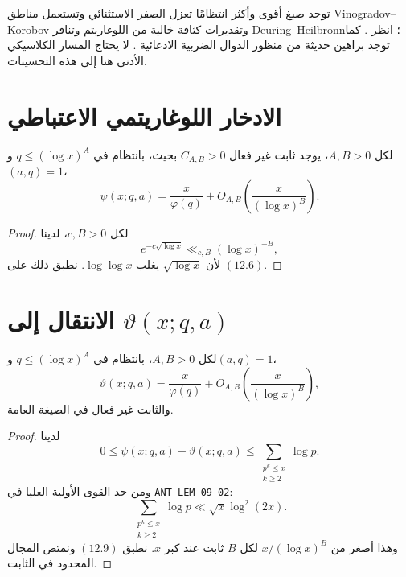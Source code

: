 \begin{remark}
توجد صيغ أقوى وأكثر انتظامًا تعزل الصفر الاستثنائي وتستعمل مناطق
Vinogradov--Korobov وتقديرات كثافة خالية من اللوغاريتم وتنافر
Deuring--Heilbronn؛ انظر \cite{ThornerZaman2024}. كما توجد براهين حديثة
من منظور الدوال الضربية الادعائية \cite{Koukoulopoulos2013}. لا يحتاج
المسار الكلاسيكي الأدنى هنا إلى هذه التحسينات.
\end{remark}

\section{الادخار اللوغاريتمي الاعتباطي}

\begin{corollary}
\label{cor:chapter12-siegel-walfisz-log-saving}
\provedhere
لكل \(A,B>0\)، يوجد ثابت غير فعال \(C_{A,B}>0\) بحيث، بانتظام في
\(q\le(\log x)^A\) و\((a,q)=1\)،
\[
\psi(x;q,a)
=
\frac{x}{\varphi(q)}
+O_{A,B}\!\left(\frac{x}{(\log x)^B}\right).
\tag{12.9}
\]
\end{corollary}

\begin{proof}
لكل \(c,B>0\)، لدينا
\[
e^{-c\sqrt{\log x}}\ll_{c,B}(\log x)^{-B},
\]
لأن \(\sqrt{\log x}\) يغلب \(\log\log x\). نطبق ذلك على \((12.6)\).
\end{proof}

\section{الانتقال إلى \(\vartheta(x;q,a)\)}

\begin{corollary}
\label{cor:chapter12-siegel-walfisz-theta}
\provedhere
لكل \(A,B>0\)، بانتظام في \(q\le(\log x)^A\) و\((a,q)=1\)،
\[
\vartheta(x;q,a)
=
\frac{x}{\varphi(q)}
+O_{A,B}\!\left(\frac{x}{(\log x)^B}\right),
\tag{12.10}
\]
والثابت غير فعال في الصيغة العامة.
\end{corollary}

\begin{proof}
لدينا
\[
0\le
\psi(x;q,a)-\vartheta(x;q,a)
\le
\sum_{\substack{p^k\le x\\k\ge2}}\log p.
\]
ومن حد القوى الأولية العليا في \textenglish{\texttt{ANT-LEM-09-02}}:
\[
\sum_{\substack{p^k\le x\\k\ge2}}\log p
\ll \sqrt x\log^2(2x).
\]
وهذا أصغر من \(x/(\log x)^B\) لكل \(B\) ثابت عند كبر \(x\). نطبق
\((12.9)\) ونمتص المجال المحدود في الثابت.
\end{proof}


